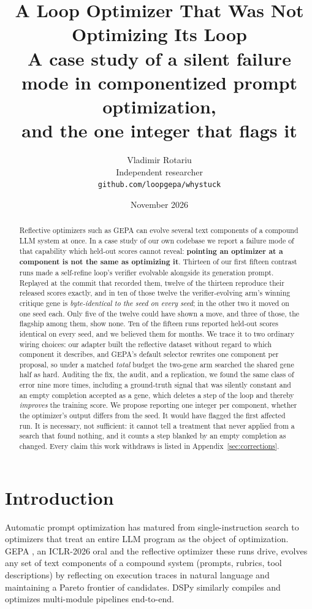 \documentclass[11pt]{article}
\title{A Loop Optimizer That Was Not Optimizing Its Loop\\
\large A case study of a silent failure mode in componentized prompt optimization,\\
and the one integer that flags it}
\author{Vladimir Rotariu \\ Independent researcher \\
  \texttt{github.com/loopgepa/whystuck}}
\date{November 2026}
\begin{document}
\maketitle

\begin{abstract}
Reflective optimizers such as GEPA \citep{agrawal2025gepa} can evolve several text components of a
compound LLM system at once. In a case study of our own codebase we report a failure mode of that
capability which held-out scores cannot reveal: \textbf{pointing an optimizer at a component is not
the same as optimizing it}.
Thirteen of our first fifteen contrast runs made a self-refine loop's verifier evolvable alongside
its generation prompt. Replayed at the commit that recorded them, twelve of the thirteen reproduce
their released scores exactly, and in ten of those twelve the verifier-evolving arm's winning
critique gene is \emph{byte-identical to the seed on every seed}; in the other two it moved on one
seed each. Only five of the twelve could have shown a move, and three of those, the flagship among
them, show none.
Ten of the fifteen runs reported held-out scores identical on every seed, and we believed
them for months. We trace it to two ordinary wiring choices: our adapter built the reflective dataset
without regard to which component it describes, and GEPA's default selector rewrites one component
per proposal, so under a matched \emph{total} budget the two-gene arm searched the shared gene half
as hard. Auditing the fix, the audit,
and a replication, we found the same class of error nine more times, including a ground-truth signal
that was silently constant and an empty completion accepted as a gene, which deletes a step of the
loop and thereby \emph{improves} the training score. We propose reporting one integer per
component, whether the optimizer's output differs from the seed. It would have flagged the first
affected run. It is necessary, not sufficient: it cannot tell a treatment that never applied from a
search that found nothing, and it counts a step blanked by an empty completion as changed. Every
claim this work withdraws is listed in Appendix~\ref{sec:corrections}.
\end{abstract}



\section{Introduction}
\label{sec:intro}

Automatic prompt optimization has matured from single-instruction search
\citep{yang2023opro} to optimizers that treat an entire LLM program as
the object of optimization. GEPA \citep{agrawal2025gepa}, an ICLR-2026 oral and
the reflective optimizer these runs drive, evolves any set of
text components of a compound system (prompts, rubrics, tool descriptions)
by reflecting on execution traces in natural language and maintaining a Pareto
frontier of candidates. DSPy \citep{khattab2023dspy} similarly compiles and
optimizes multi-module pipelines end-to-end.
\end{document}
